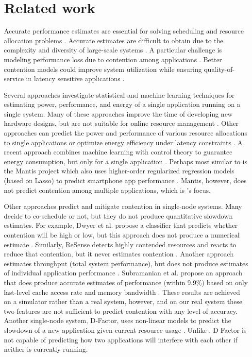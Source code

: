 \section{Related work}
Accurate performance estimates are essential for solving scheduling
and resource allocation problems \cite{chiang2002impact}.  Accurate
estimates are difficult to obtain due to the complexity and diversity
of large-scale systems \cite{kanev2015profiling}.  A particular
challenge is modeling performance loss due to contention among
applications \cite{kambadur2012measuring}.  Better contention models
could improve system utilization while ensuring quality-of-service in
latency sensitive applications \cite{Bubble-flux}.

Several approaches investigate statistical and machine learning
techniques for estimating power, performance, and energy of a single
application running on a single system.  Many of these approaches
improve the time of developing new hardware designs, but are not
suitable for online resource management
\cite{Yi2003,LeeBrooks2006,CPR}.  Other approaches can predict the
power and performance of various resource allocations to single
applications \cite{Koala} or optimize energy efficiency under latency
constraints \cite{LEO}.  A recent approach combines machine learning
with control theory to guarantee energy consumption, but only for a
single application \cite{JouleGuard}.  Perhaps most similar to
\SYSTEM{} is the Mantis project which also uses higher-order
regularized regression models (based on Lasso) to predict smartphone
app performance \cite{kwon2013mantis}.  Mantis, however, does not
predict contention among multiple applications, which is \SYSTEM{}'s
focus.

Other approaches predict and mitigate contention in single-node
systems.  Many decide to co-schedule or not, but they do not produce
quantitative slowdown estimates.  For example, Dwyer et al. propose a
classifier that predicts whether contention will be high or low, but
this approach does not produce a numerical estimate
\cite{dwyer2012practical}.  Similarly, ReSense detects highly
contended resources and reacts to reduce that contention, but it never
estimates contention \cite{resense}. Another approach estimates
throughput (total system performance), but does not produce estimates
of individual application performance
\cite{xu2010cache,chen2010performance}.  Subramanian et al. propose an
approach that does produce accurate estimates of performance (within
9.9\%) based on only last-level cache access rate and memory bandwidth
\cite{subramanian2015slowdown}.  These results are achieved on a
simulator rather than a real system, however, and on our real system
these two features are not sufficient to predict contention with any
level of accuracy.  Another single-node system, D-Factor, uses
non-linear models to predict the slowdown of a new application given
current resource usage \cite{Lim2012dfactor}.  Unlike \SYSTEM{},
D-Factor is not capable of predicting how two applications will
interfere with each other if neither is currently running.

